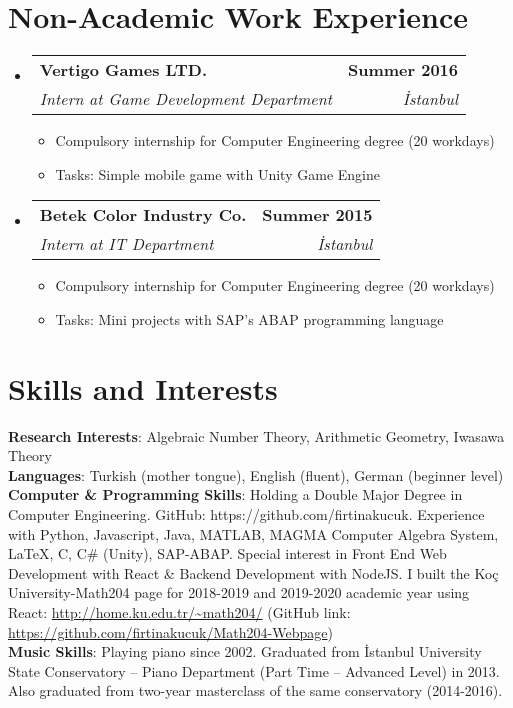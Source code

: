 \documentclass[letterpaper,11pt]{article}
\makeatletter
\newcommand{\resumeItem}[1]{
  \item\small{
    {#1 \vspace{-2pt}}
  }
}
\newcommand{\resumeSubheading}[4]{
  \vspace{-2pt}\item
    \begin{tabular*}{1.0\textwidth}[t]{l@{\extracolsep{\fill}}r}
      \textbf{#1} & \textbf{\small #2} \\
      \textit{\small#3} & \textit{\small #4} \\
    \end{tabular*}\vspace{-7pt}
}
\newcommand{\resumeSubHeadingListStart}{\begin{itemize}[leftmargin=0.0in, label={}]}
\newcommand{\resumeSubHeadingListEnd}{\end{itemize}}
\newcommand{\resumeItemListStart}{\begin{itemize}}
\newcommand{\resumeItemListEnd}{\end{itemize}\vspace{-5pt}}
\makeatother
\begin{document}
 \section{Non-Academic Work Experience}
  \resumeSubHeadingListStart
    \resumeSubheading
      {Vertigo Games LTD.}{Summer 2016}
      {Intern at Game Development Department}{İstanbul}
      \resumeItemListStart
        \resumeItem {Compulsory internship for Computer Engineering degree (20 workdays)}
        \resumeItem {Tasks: Simple mobile game with Unity Game Engine}
    \resumeItemListEnd
    \resumeSubheading
      {Betek Color Industry Co.}{Summer 2015}
      {Intern at IT Department}{İstanbul}
      \resumeItemListStart
        \resumeItem {Compulsory internship for Computer Engineering degree (20 workdays)}
        \resumeItem {Tasks: Mini projects with SAP’s ABAP programming language}
    \resumeItemListEnd
      
  \resumeSubHeadingListEnd
\vspace{-16pt}
\section{Skills and Interests}
 \begin{itemize}[leftmargin=0.1in, label={}]
    \small{\item{
     \textbf{Research Interests}{: Algebraic Number Theory, Arithmetic Geometry, Iwasawa Theory} \\
     \textbf{Languages}{: Turkish (mother tongue), English (fluent), German (beginner level)} \\
     \textbf{Computer \& Programming Skills}{: Holding a Double Major Degree in Computer Engineering. GitHub: https://github.com/firtinakucuk. Experience with Python, Javascript, Java, MATLAB, MAGMA Computer Algebra System, LaTeX, C, C\# (Unity), SAP-ABAP. Special interest in Front End Web Development with React \& Backend Development with NodeJS. I built the Koç University-Math204 page for 2018-2019 and 2019-2020 academic year using React: \url{http://home.ku.edu.tr/~math204/} (GitHub link: \url{https://github.com/firtinakucuk/Math204-Webpage})}\\
     \textbf{Music Skills}{: Playing piano since 2002. Graduated from İstanbul University State Conservatory -- Piano Department (Part Time -- Advanced Level) in 2013. Also graduated from two-year masterclass of the same conservatory (2014-2016).}\\
    }}
 \end{itemize}
 \vspace{-16pt}
\end{document}
